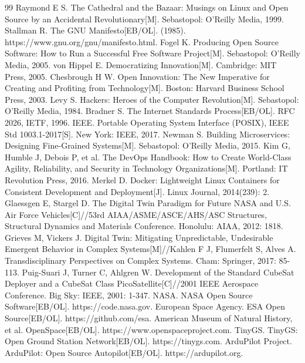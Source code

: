 \documentclass[11pt]{article}
\begin{document}
\begin{thebibliography}{99}
 Raymond E S. The Cathedral and the Bazaar: Musings on Linux and Open Source by an Accidental Revolutionary[M]. Sebastopol: O'Reilly Media, 1999.
 Stallman R. The GNU Manifesto[EB/OL]. (1985). https://www.gnu.org/gnu/manifesto.html.
 Fogel K. Producing Open Source Software: How to Run a Successful Free Software Project[M]. Sebastopol: O'Reilly Media, 2005.
 von Hippel E. Democratizing Innovation[M]. Cambridge: MIT Press, 2005.
 Chesbrough H W. Open Innovation: The New Imperative for Creating and Profiting from Technology[M]. Boston: Harvard Business School Press, 2003.
 Levy S. Hackers: Heroes of the Computer Revolution[M]. Sebastopol: O'Reilly Media, 1984.
 Bradner S. The Internet Standards Process[EB/OL]. RFC 2026, IETF, 1996.
 IEEE. Portable Operating System Interface (POSIX), IEEE Std 1003.1-2017[S]. New York: IEEE, 2017.
 Newman S. Building Microservices: Designing Fine-Grained Systems[M]. Sebastopol: O'Reilly Media, 2015.
 Kim G, Humble J, Debois P, et al. The DevOps Handbook: How to Create World-Class Agility, Reliability, and Security in Technology Organizations[M]. Portland: IT Revolution Press, 2016.
 Merkel D. Docker: Lightweight Linux Containers for Consistent Development and Deployment[J]. Linux Journal, 2014(239): 2.
 Glaessgen E, Stargel D. The Digital Twin Paradigm for Future NASA and U.S. Air Force Vehicles[C]//53rd AIAA/ASME/ASCE/AHS/ASC Structures, Structural Dynamics and Materials Conference. Honolulu: AIAA, 2012: 1818.
 Grieves M, Vickers J. Digital Twin: Mitigating Unpredictable, Undesirable Emergent Behavior in Complex Systems[M]//Kahlen F J, Flumerfelt S, Alves A. Transdisciplinary Perspectives on Complex Systems. Cham: Springer, 2017: 85-113.
 Puig-Suari J, Turner C, Ahlgren W. Development of the Standard CubeSat Deployer and a CubeSat Class PicoSatellite[C]//2001 IEEE Aerospace Conference. Big Sky: IEEE, 2001: 1-347.
 NASA. NASA Open Source Software[EB/OL]. https://code.nasa.gov.
 European Space Agency. ESA Open Source[EB/OL]. https://github.com/esa.
 American Museum of Natural History, et al. OpenSpace[EB/OL]. https://www.openspaceproject.com.
 TinyGS. TinyGS: Open Ground Station Network[EB/OL]. https://tinygs.com.
 ArduPilot Project. ArduPilot: Open Source Autopilot[EB/OL]. https://ardupilot.org.

\end{thebibliography}
\end{document}
